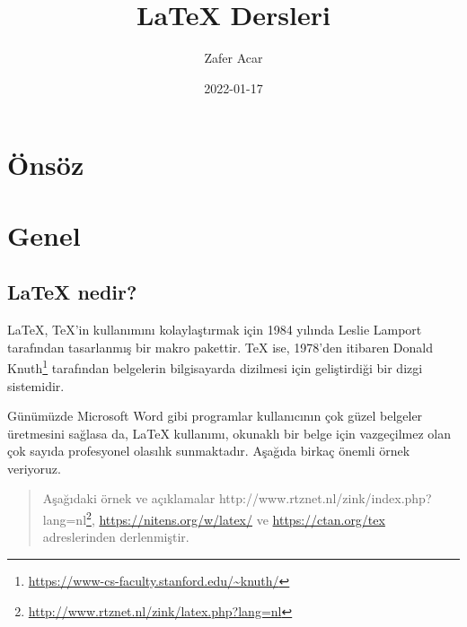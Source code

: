 \documentclass[
  10pt,
]{scrbook}
\title{LaTeX Dersleri}
\author{Zafer Acar}
\date{2022-01-17}
\newenvironment{Shaded}{\begin{snugshade}}{\end{snugshade}}
\newcommand{\BuiltInTok}[1]{#1}
\newcommand{\ExtensionTok}[1]{#1}
\newcommand{\KeywordTok}[1]{\textcolor[rgb]{0.13,0.29,0.53}{\textbf{#1}}}
\newcommand{\NormalTok}[1]{#1}
\newcommand{\SpecialCharTok}[1]{\textcolor[rgb]{0.00,0.00,0.00}{#1}}
\newcommand{\SpecialStringTok}[1]{\textcolor[rgb]{0.31,0.60,0.02}{#1}}
\renewcommand{\href}[2]{#2\footnote{\url{#1}}}
\begin{document}
\maketitle



{
\setcounter{tocdepth}{2}
\tableofcontents
}
\listoffigures
\listoftables
\hypertarget{uxf6nsuxf6z}{%
\chapter*{Önsöz}\label{uxf6nsuxf6z}}


\begin{Shaded}
\end{Shaded}

\citep{talbot2012}

\mainmatter

\hypertarget{genel}{%
\chapter{Genel}\label{genel}}

\hypertarget{latex-nedir}{%
\section{LaTeX nedir?}\label{latex-nedir}}

LaTeX, TeX'in kullanımını kolaylaştırmak için 1984 yılında Leslie
Lamport tarafından tasarlanmış bir makro pakettir. TeX ise, 1978'den
itibaren \href{https://www-cs-faculty.stanford.edu/~knuth/}{Donald
Knuth} tarafından belgelerin bilgisayarda dizilmesi
için geliştirdiği bir dizgi sistemidir.

Günümüzde Microsoft Word gibi programlar kullanıcının çok güzel belgeler
üretmesini sağlasa da, LaTeX kullanımı, okunaklı bir belge için
vazgeçilmez olan çok sayıda profesyonel olasılık sunmaktadır. Aşağıda
birkaç önemli örnek veriyoruz.

\begin{quote}
Aşağıdaki örnek ve açıklamalar
\href{http://www.rtznet.nl/zink/latex.php?lang=nl}{http://www.rtznet.nl/zink/index.php?lang=nl},
\url{https://nitens.org/w/latex/} ve
\url{https://ctan.org/tex} adreslerinden derlenmiştir.
\end{quote}
\end{document}
